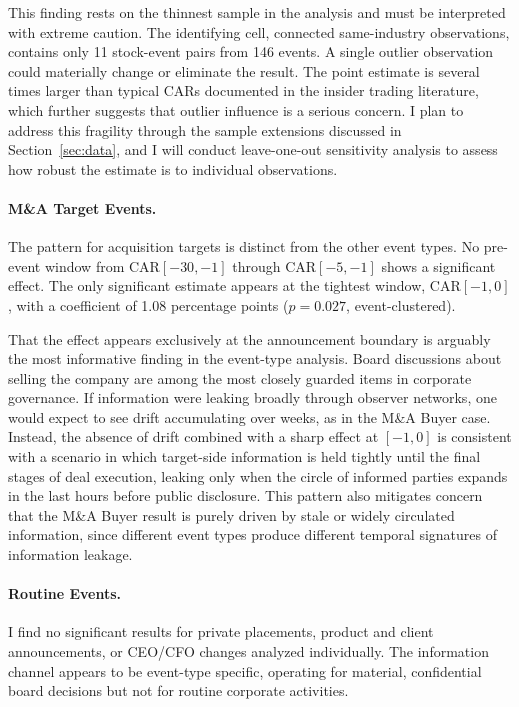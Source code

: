 This finding rests on the thinnest sample in the analysis and must be interpreted with extreme caution. The identifying cell, connected same-industry observations, contains only 11 stock-event pairs from 146 events. A single outlier observation could materially change or eliminate the result. The point estimate is several times larger than typical CARs documented in the insider trading literature, which further suggests that outlier influence is a serious concern. I plan to address this fragility through the sample extensions discussed in Section~\ref{sec:data}, and I will conduct leave-one-out sensitivity analysis to assess how robust the estimate is to individual observations.

\paragraph{M\&A Target Events.} The pattern for acquisition targets is distinct from the other event types. No pre-event window from CAR$[-30,-1]$ through CAR$[-5,-1]$ shows a significant effect. The only significant estimate appears at the tightest window, CAR$[-1,0]$, with a coefficient of 1.08 percentage points ($p=0.027$, event-clustered).

That the effect appears exclusively at the announcement boundary is arguably the most informative finding in the event-type analysis. Board discussions about selling the company are among the most closely guarded items in corporate governance. If information were leaking broadly through observer networks, one would expect to see drift accumulating over weeks, as in the M\&A Buyer case. Instead, the absence of drift combined with a sharp effect at $[-1,0]$ is consistent with a scenario in which target-side information is held tightly until the final stages of deal execution, leaking only when the circle of informed parties expands in the last hours before public disclosure. This pattern also mitigates concern that the M\&A Buyer result is purely driven by stale or widely circulated information, since different event types produce different temporal signatures of information leakage.

\paragraph{Routine Events.} I find no significant results for private placements, product and client announcements, or CEO/CFO changes analyzed individually. The information channel appears to be event-type specific, operating for material, confidential board decisions but not for routine corporate activities.

